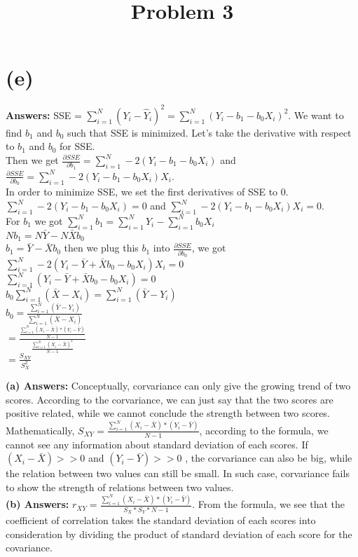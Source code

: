 \documentclass{article}
\begin{document}
\section{(e)}\textbf{Answers:} SSE = $\sum^N_{i=1} (Y_i - \hat{Y}_i)^2 = \sum^N_{i=1} (Y_i - b_1 - b_0X_i)^2$. We want to find $b_1$ and $b_0$ such that SSE is minimized. Let's take the derivative with respect to $b_1$ and $b_0$ for SSE. \\
Then we get $\frac{\partial SSE}{\partial b_1} = \sum^N_{i=1} -2(Y_i - b_1 - b_0X_i)$ and $\frac{\partial SSE}{\partial b_0} = \sum^N_{i=1} -2(Y_i - b_1 - b_0X_i)X_i$. \\
In order to minimize SSE, we set the first derivatives of SSE to 0. $\sum^N_{i=1} -2(Y_i - b_1 - b_0X_i) = 0$ and $\sum^N_{i=1} -2(Y_i - b_1 - b_0X_i)X_i = 0$. \\
For $b_1$ we got $\sum^N_{i=1} b_1 = \sum^N_{i=1} Y_i - \sum^N_{i=1} b_0X_i $\\
$Nb_1 = N\bar{Y} - N\bar{X}b_0$\\
$b_1 = \bar{Y} - \bar{X}b_0$
then we plug this $b_1$ into $\frac{\partial SSE}{\partial b_0}$, we got $\sum^N_{i=1} -2(Y_i - \bar{Y} + \bar{X}b_0 - b_0X_i)X_i = 0$\\
$\sum^N_{i=1} (Y_i - \bar{Y} + \bar{X}b_0 - b_0X_i) = 0$\\
$b_0 \sum^N_{i=1} (\bar{X} - X_i) = \sum^N_{i=1} (\bar{Y} - Y_i)$\\
$b_0 = \frac{\sum^N_{i=1} (\bar{Y} - Y_i)}{\sum^N_{i=1} (\bar{X} - X_i)}$\\
$= \frac{\frac{\sum_{i=1}^{N}\left(X_{i}-\bar{X}\right) *\left(Y_{i}-\bar{Y}\right)}{N-1}}{\frac{\sum_{i=1}^{N}\left(X_{i}-\bar{X}\right)^{2}}{N-1}}$\\
$ = \frac{S_{X Y}}{S_{X}^{2}}$\\

\title{Problem 3}

\textbf{(a) Answers:} Conceptually, corvariance can only give the growing trend of two scores. According to the corvariance, we can just say that the two scores are positive related, while we cannot conclude the strength between two scores. Mathematically, $S_{X Y}=\frac{\sum_{i=1}^{N}\left(X_{i}-\bar{X}\right) *\left(Y_{i}-\bar{Y}\right)}{N-1}$, according to the formula, we cannot see any information about standard deviation of each scores. If $\left(X_{i}-\bar{X}\right) >> 0$ and $\left(Y_{i}-\bar{Y}\right) >> 0$  , the corvariance can also be big, while the relation between two values can still be small. In such case, corvariance fails to show the strength of relations between two values.\\
\textbf{(b) Answers:} $r_{X Y}=\frac{\sum_{i=1}^{N}\left(X_{i}-\bar{X}\right) *\left(Y_{i}-\bar{Y}\right)}{S_{X} * S_{Y} * N-1}$. From the formula, we see that the coefficient of correlation takes the standard deviation of each scores into consideration by dividing the product of standard deviation of each score for the covariance.  
\end{document}
